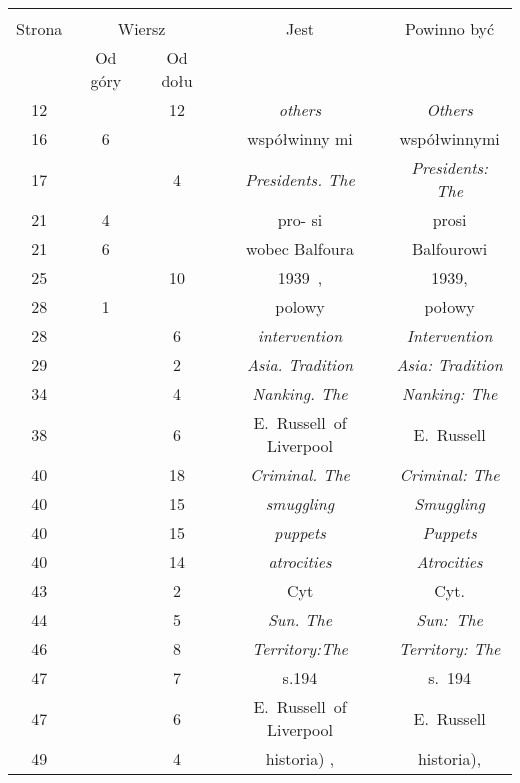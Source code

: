 \documentclass[a4paper,11pt]{article}
\begin{document}
\vspace{\spaceFour}







\begin{center}

  \begin{tabular}{|c|c|c|c|c|}
    \hline
    & \multicolumn{2}{c|}{} & & \\
    Strona & \multicolumn{2}{c|}{Wiersz} & Jest
                              & Powinno być \\ \cline{2-3}
    & Od góry & Od dołu & & \\
    \hline
    12  & & 12 & \textit{others} & \textit{Others} \\
    16  &  6 & & współwinny mi & współwinnymi \\
    17  & &  4 & \textit{Presidents. The} & \textit{Presidents: The} \\
    21  &  4 & & pro- si & prosi \\
    21  &  6 & & wobec Balfoura & Balfourowi \\
    25  & & 10 & 1939~, & 1939, \\
    28  &  1 & & polowy & połowy \\
    28  & &  6 & \textit{intervention} & \textit{Intervention} \\
    29  & &  2 & \textit{Asia. Tradition} & \textit{Asia: Tradition} \\
    34  & &  4 & \textit{Nanking. The} & \textit{Nanking: The} \\
    38  & &  6 & E.~Russell~of Liverpool & E.~Russell \\
    40  & & 18 & \textit{Criminal. The} & \textit{Criminal: The} \\
    40  & & 15 & \textit{smuggling} & \textit{Smuggling} \\
    40  & & 15 & \textit{puppets} & \textit{Puppets} \\
    40  & & 14 & \textit{atrocities} & \textit{Atrocities} \\
    43  & &  2 & Cyt & Cyt. \\
    44  & &  5 & \textit{Sun. The} & \textit{Sun:~The} \\
    46  & &  8 & \textit{Territory:The} & \textit{Territory: The} \\
    47  & &  7 & s.194 & s.~194 \\
    47  & &  6 & E.~Russell~of Liverpool & E.~Russell \\
    49  & &  4 & historia) , & historia), \\
    \hline
  \end{tabular}






\end{center}
\end{document}
